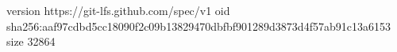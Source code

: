 version https://git-lfs.github.com/spec/v1
oid sha256:aaf97cdbd5cc18090f2c09b13829470dbfbf901289d3873d4f57ab91c13a6153
size 32864
